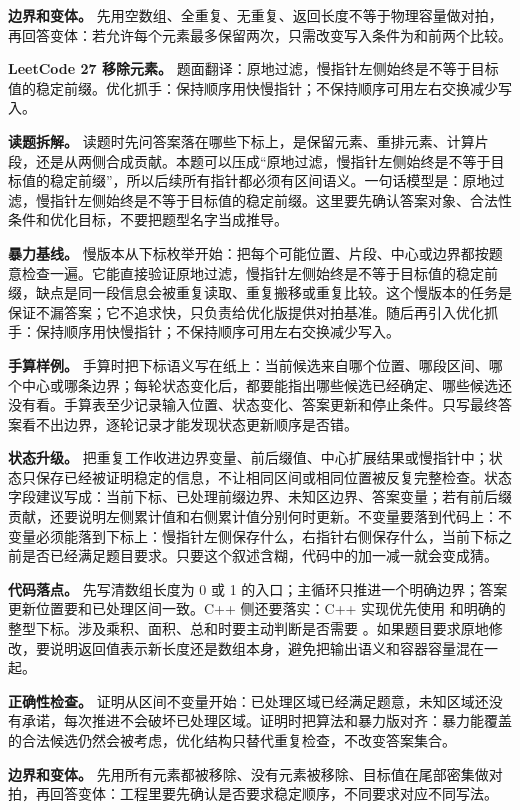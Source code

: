 \textbf{边界和变体。} 先用空数组、全重复、无重复、返回长度不等于物理容量做对拍，再回答变体：若允许每个元素最多保留两次，只需改变写入条件为和前两个比较。

\noindent\textbf{LeetCode 27 移除元素。} 题面翻译：原地过滤，慢指针左侧始终是不等于目标值的稳定前缀。优化抓手：保持顺序用快慢指针；不保持顺序可用左右交换减少写入。

\textbf{读题拆解。} 读题时先问答案落在哪些下标上，是保留元素、重排元素、计算片段，还是从两侧合成贡献。本题可以压成“原地过滤，慢指针左侧始终是不等于目标值的稳定前缀”，所以后续所有指针都必须有区间语义。一句话模型是：原地过滤，慢指针左侧始终是不等于目标值的稳定前缀。这里要先确认答案对象、合法性条件和优化目标，不要把题型名字当成推导。

\textbf{暴力基线。} 慢版本从下标枚举开始：把每个可能位置、片段、中心或边界都按题意检查一遍。它能直接验证原地过滤，慢指针左侧始终是不等于目标值的稳定前缀，缺点是同一段信息会被重复读取、重复搬移或重复比较。这个慢版本的任务是保证不漏答案；它不追求快，只负责给优化版提供对拍基准。随后再引入优化抓手：保持顺序用快慢指针；不保持顺序可用左右交换减少写入。

\textbf{手算样例。} 手算时把下标语义写在纸上：当前候选来自哪个位置、哪段区间、哪个中心或哪条边界；每轮状态变化后，都要能指出哪些候选已经确定、哪些候选还没有看。手算表至少记录输入位置、状态变化、答案更新和停止条件。只写最终答案看不出边界，逐轮记录才能发现状态更新顺序是否错。

\textbf{状态升级。} 把重复工作收进边界变量、前后缀值、中心扩展结果或慢指针中；状态只保存已经被证明稳定的信息，不让相同区间或相同位置被反复完整检查。状态字段建议写成：当前下标、已处理前缀边界、未知区边界、答案变量；若有前后缀贡献，还要说明左侧累计值和右侧累计值分别何时更新。不变量要落到代码上：不变量必须能落到下标上：慢指针左侧保存什么，右指针右侧保存什么，当前下标之前是否已经满足题目要求。只要这个叙述含糊，代码中的加一减一就会变成猜。

\textbf{代码落点。} 先写清数组长度为 0 或 1 的入口；主循环只推进一个明确边界；答案更新位置要和已处理区间一致。C++ 侧还要落实：C++ 实现优先使用  和明确的整型下标。涉及乘积、面积、总和时要主动判断是否需要 。如果题目要求原地修改，要说明返回值表示新长度还是数组本身，避免把输出语义和容器容量混在一起。

\textbf{正确性检查。} 证明从区间不变量开始：已处理区域已经满足题意，未知区域还没有承诺，每次推进不会破坏已处理区域。证明时把算法和暴力版对齐：暴力能覆盖的合法候选仍然会被考虑，优化结构只替代重复检查，不改变答案集合。

\textbf{边界和变体。} 先用所有元素都被移除、没有元素被移除、目标值在尾部密集做对拍，再回答变体：工程里要先确认是否要求稳定顺序，不同要求对应不同写法。

